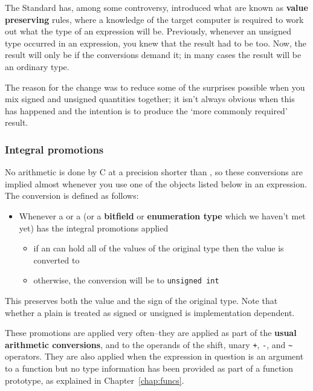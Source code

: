   The Standard has, among some controversy, introduced what are known as
    \textbf{value preserving} rules, where a knowledge of the target
    computer is required to work out what the type of an expression will be.
    Previously, whenever an unsigned type occurred in an expression, you knew
    that the result had to be \unsigned{} too. Now, the result will
    only be \unsigned{} if the conversions demand it; in many cases
    the result will be an ordinary \signed{} type.


   The reason for the change was to reduce some of the surprises possible
    when you mix signed and unsigned quantities together; it isn't always
    obvious when this has happened and the intention is to produce the
    `more commonly required' result.


   \subsubsection{Integral promotions}
    

    No arithmetic is done by C at a precision shorter than
     \kint, so these conversions are implied almost whenever you
     use one of the objects listed below in an expression. The conversion is
     defined as follows:


    \begin{itemize}
     \item Whenever a \short{} or a \kchar{} (or a
      \textbf{bitfield} or \textbf{enumeration type} which we haven't met
      yet) has the integral promotions applied
      \begin{itemize}
       \item if an \kint{} can hold all of the values of the original
        type then the value is converted to \kint{}
       \item otherwise, the conversion will be to \texttt{unsigned int}
      \end{itemize}
     
    \end{itemize}

    This preserves both the value and the sign of the original type. Note
     that whether a plain \kchar{} is treated as signed or unsigned
     is implementation dependent.


    These promotions are applied very often--they are applied as part
     of the \textbf{usual arithmetic conversions}, and to the operands of
     the shift, unary \texttt{+}, \texttt{-}, and \texttt{\~}
     operators. They are also applied when the expression in question is an
     argument to a function but no type information has been provided as part
     of a function prototype, as explained in Chapter~\ref{chap:funcs}.


